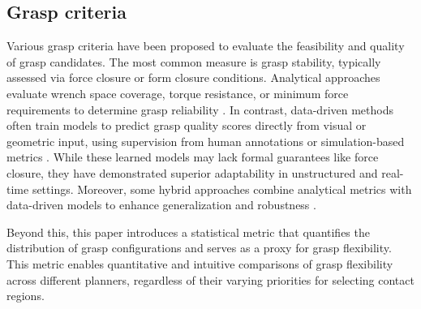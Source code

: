 \documentclass[journal]{IEEEtran}
\newcommand{\rev}[1]{\textcolor{red}{#1}}
\begin{document}


\subsection{Grasp criteria}
Various grasp criteria have been proposed to evaluate the feasibility and quality of grasp candidates. The most common measure is grasp stability, typically assessed via force closure or form closure conditions. Analytical approaches evaluate wrench space coverage, torque resistance, or minimum force requirements to determine grasp reliability \cite{bicchi2000robotic}\cite{ferrari1992planning}. 
In contrast, data-driven methods often train models to predict grasp quality scores directly from visual or geometric input, using supervision from human annotations or simulation-based metrics \cite{yu2024mtgrasp}. While these learned models may lack formal guarantees like force closure, they have demonstrated superior adaptability in unstructured and real-time settings. Moreover, some hybrid approaches combine analytical metrics with data-driven models to enhance generalization and robustness \cite{kopicki2014learning}\cite{ten2017grasp}. 

Beyond this, this paper introduces a statistical metric that quantifies the distribution of grasp configurations and serves as a proxy for grasp flexibility. This metric enables quantitative and intuitive comparisons of grasp flexibility across different planners, regardless of their varying priorities for selecting contact regions.
\end{document}
